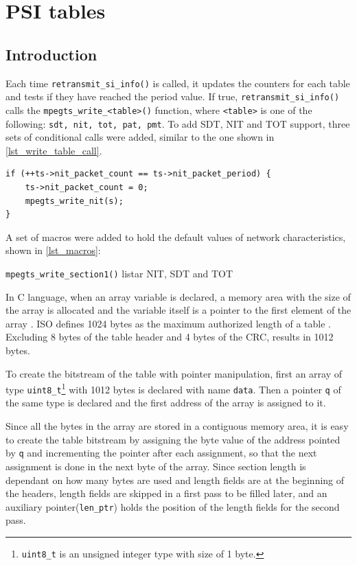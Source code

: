 \documentclass[
	12pt,				%
	openright,			%
	twoside,			%
	a4paper,			%
	brazil,
	french,				%
	english
	]{abntex2}
\begin{document}
\section{PSI tables}

\subsection{Introduction}
Each time \texttt{retransmit\_si\_info()} is called, it updates the counters for each table and tests if they have reached the period value. If true, \texttt{retransmit\_si\_info()} calls the \texttt{mpegts\_write\_<table>()} function, where \texttt{<table>} is one of the following: \texttt{sdt, nit, tot, pat, pmt}. To add SDT, NIT and TOT support, three sets of conditional calls were added, similar to the one shown in \autoref{lst_write_table_call}.

\begin{lstlisting}[caption={Conditional call to \texttt{mpegts\_write\_nit()}.}, label={lst_write_table_call}]
if (++ts->nit_packet_count == ts->nit_packet_period) {
    ts->nit_packet_count = 0;
    mpegts_write_nit(s);
}
\end{lstlisting}

A set of macros were added to hold the default values of network characteristics, shown in \autoref{lst_macros}:

\texttt{mpegts\_write\_section1()}
listar NIT, SDT and TOT

In C language, when an array variable is declared, a memory area with the size of the array is allocated and the variable itself is a pointer to the first element of the array . ISO defines 1024 bytes as the maximum authorized length of a table . Excluding 8 bytes of the table header and 4 bytes of the CRC, results in 1012 bytes.

To create the bitstream of the table with pointer manipulation, first an array of type \texttt{uint8\_t}\footnote{\texttt{uint8\_t} is an unsigned integer type with size of 1 byte.} with 1012 bytes is declared with name \texttt{data}. Then a pointer \texttt{q} of the same type is declared and the first address of the array is assigned to it.

Since all the bytes in the array are stored in a contiguous memory area, it is easy to create the table bitstream by assigning the byte value of the address pointed by \texttt{q} and incrementing the pointer after each assignment, so that the next assignment is done in the next byte of the array. Since section length is dependant on how many bytes are used and length fields are at the beginning of the headers, length fields are skipped in a first pass to be filled later, and an auxiliary pointer(\texttt{len\_ptr}) holds the position of the length fields for the second pass. 
\end{document}
